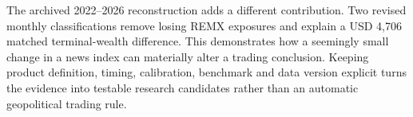 The archived 2022–2026 reconstruction adds a different contribution. Two revised monthly classifications remove losing REMX exposures and explain a USD 4,706 matched terminal-wealth difference. This demonstrates how a seemingly small change in a news index can materially alter a trading conclusion. Keeping product definition, timing, calibration, benchmark and data version explicit turns the evidence into testable research candidates rather than an automatic geopolitical trading rule.
